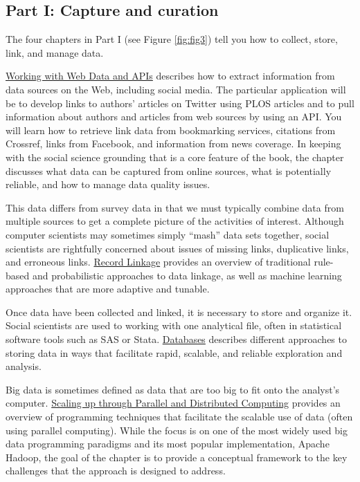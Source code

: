 \documentclass[]{krantz}
\begin{document}
\subsection{Part I: Capture and
curation}\label{part-i-capture-and-curation}

The four chapters in Part I (see Figure \ref{fig:fig3}) tell you how to
collect, store, link, and manage data.

\protect\hyperlink{chap:web}{Working with Web Data and APIs} describes
how to extract information from data sources on the Web, including
social media. The particular application will be to develop links to
authors' articles on Twitter using PLOS articles and to pull information
about authors and articles from web sources by using an API. You will
learn how to retrieve link data from bookmarking services, citations
from Crossref, links from Facebook, and information from news coverage.
In keeping with the social science grounding that is a core feature of
the book, the chapter discusses what data can be captured from online
sources, what is potentially reliable, and how to manage data quality
issues.

This data differs from survey data in that we must typically combine
data from multiple sources to get a complete picture of the activities
of interest. Although computer scientists may sometimes simply ``mash''
data sets together, social scientists are rightfully concerned about
issues of missing links, duplicative links, and erroneous links.
\protect\hyperlink{chap:link}{Record Linkage} provides an overview of
traditional rule-based and probabilistic approaches to data linkage, as
well as machine learning approaches that are more adaptive and tunable.

Once data have been collected and linked, it is necessary to store and
organize it. Social scientists are used to working with one analytical
file, often in statistical software tools such as SAS or Stata.
\protect\hyperlink{chap:db}{Databases} describes different approaches to
storing data in ways that facilitate rapid, scalable, and reliable
exploration and analysis.

Big data is sometimes defined as data that are too big to fit onto the
analyst's computer. \protect\hyperlink{chap:parallel}{Scaling up through
Parallel and Distributed Computing} provides an overview of programming
techniques that facilitate the scalable use of data (often using
parallel computing). While the focus is on one of the most widely used
big data programming paradigms and its most popular implementation,
Apache Hadoop, the goal of the chapter is to provide a conceptual
framework to the key challenges that the approach is designed to
address.
\end{document}
